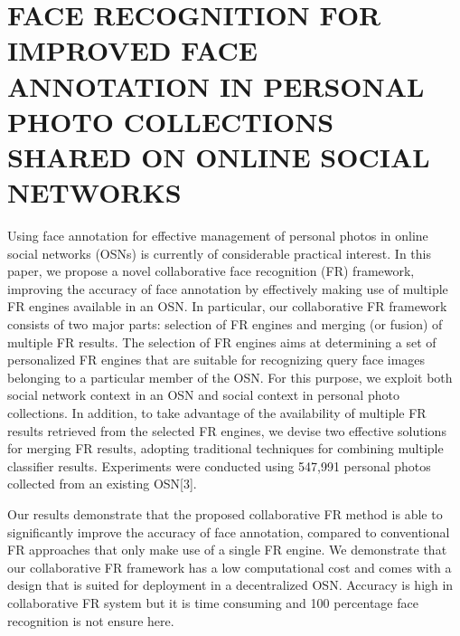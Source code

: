 \section[Face Recognition for Improved Face Annotation in Personal Photo Collections Shared on Online Social Networks ]{\fontsize{14}{12}\selectfont  FACE RECOGNITION FOR IMPROVED FACE ANNOTATION IN PERSONAL PHOTO COLLECTIONS SHARED ON ONLINE SOCIAL NETWORKS}
\noindent
Using face annotation for effective management of personal photos in online social networks (OSNs) is currently of considerable practical interest. In this paper, we propose a novel collaborative face recognition (FR) framework, improving the accuracy of face annotation by effectively making use of multiple FR engines available in an OSN. In particular, our collaborative FR framework consists of two major parts: selection of FR engines and merging (or fusion) of multiple FR results. The selection of FR engines aims at determining a set of personalized FR engines that are suitable for recognizing query face images belonging to a particular member of the OSN. For this purpose, we exploit both social network context in an OSN and social context in personal photo collections. In addition, to take advantage of the availability of multiple FR results retrieved from the selected FR engines, we devise two effective solutions for merging FR results, adopting traditional techniques for combining multiple classifier results. Experiments were conducted using 547,991 personal photos collected from an existing OSN[3].

  \vspace*{1pc}
Our results demonstrate that the proposed collaborative FR method is able to significantly improve the accuracy of face annotation, compared to conventional FR approaches that only make use of a single FR engine. We demonstrate that our collaborative FR framework has a low computational cost and comes with a design that is suited for deployment in a decentralized OSN. Accuracy is high in  collaborative FR system but it is time consuming and 100 percentage  face recognition is not ensure here.
